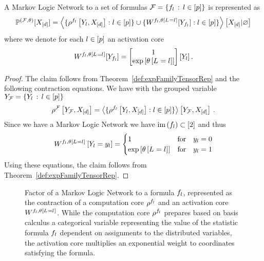 \begin{theorem}\label{the:mlnTensorRep}
	A Markov Logic Network to a set of formulas $\mathcal{F} = \{f_{l} \, : \, l\in[p]\}$ is represented as
	\begin{align*}
		\mathbb{P}^{(\mathcal{F},\theta)}[X_{[d]}] = 
		\left\langle \{\rho^{f_{l}}\left[Y_{l},X_{[d]}\right] : l\in[p] \} \cup \{W^{f_{l},\theta\left[L_{}=l_{}\right]}[Y_{f_{l}}] : l\in[p] \}
		\right\rangle \left[ X_{[d]} | \varnothing \right]
	\end{align*}
	where we denote for each $l\in[p]$ an activation core
	\begin{align*}
		W^{f_{l},\theta\left[L_{}=l_{}\right]}[Y_{f_{l}}]
		= \begin{bmatrix} 1 \\
		 \mathrm{exp}\left[\theta\left[L_{}=l_{}\right]\right] 
		 \end{bmatrix}[Y_{l}] \, .
	\end{align*}
\end{theorem}
\begin{proof}
	The claim follows from Theorem~\ref{def:expFamilyTensorRep} and the following contraction equations.
	We have with the grouped variable $Y_{\mathcal{F}} = \{Y_{l}\, : \, l\in[p]\}$
	\begin{align*}
		\rho^{\mathcal{F}}\left[Y_{\mathcal{F}},X_{[d]}\right]
		= \left\langle \{\rho^{f_{l}}\left[Y_{l},X_{[d]}\right] : l\in[p] \}\right\rangle \left[ Y_{\mathcal{F}},X_{[d]} \right] \, .
	\end{align*}
	Since we have a Markov Logic Network we have $\mathrm{im}\left(f_{l}\right)\subset [2]$ and thus
	\begin{align*}
		W^{f_{l},\theta\left[L_{}=l_{}\right]}\left[Y_{l}=y_{l}\right]
		= \begin{cases}
			1 & \text{for} \quad y_{l} = 0 \\
			\mathrm{exp}\left[\theta\left[L_{}=l_{}\right]\right] & \text{for} \quad y_{l}  = 1
		\end{cases}  
	\end{align*}
	Using these equations, the claim follows from Theorem~\ref{def:expFamilyTensorRep}.
\end{proof}

\begin{figure}[h]
\begin{center}
	
\end{center}
\caption{Factor of a Markov Logic Network to a formula $f_{l}$, represented as the contraction of a computation core $\rho^{f_{l}}$ and an activation core $W^{f_{l},\theta\left[L_{}=l_{}\right]}$.
	While the computation core $\rho^{f_{l}}$ prepares based on basis calculus a categorical variable representing the value of the statistic formula $f_{l}$ dependent on assignments to the distributed variables, the activation core multiplies an exponential weight to coordinates satisfying the formula.
}
\label{fig:mlnFactor}
\end{figure}

